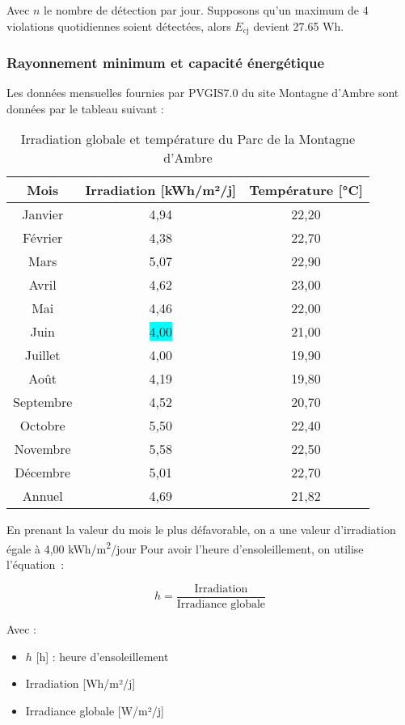 Avec \( n \) le nombre de détection par jour. Supposons qu'un maximum de 4 violations quotidiennes soient détectées, alors \( E_{\text{cj}} \) devient 27.65 Wh.

\subsubsection{	Rayonnement minimum et capacité énergétique}
Les données mensuelles fournies par PVGIS7.0 du site Montagne d'Ambre sont données par le tableau suivant :

\begin{table}[H]
	\centering
	\caption{Irradiation globale et température du Parc de la Montagne d'Ambre
}
	\vspace{5mm}
	\begin{tabular}{|c|c|c|}
		\hline
		\textbf{Mois} & \textbf{Irradiation [kWh/m²/j]} & \textbf{Température [°C]} \\
		\hline
		Janvier & 4,94 & 22,20 \\
		\hline
		Février & 4,38 & 22,70 \\
		\hline
		Mars & 5,07 & 22,90 \\
		\hline
		Avril & 4,62 & 23,00 \\
		\hline
		Mai & 4,46 & 22,00 \\
		\hline
		Juin & \colorbox{cyan}{4,00} & 21,00 \\
		\hline
		Juillet & 4,00 & 19,90 \\
		\hline
		Août & 4,19 & 19,80 \\
		\hline
		Septembre & 4,52 & 20,70 \\
		\hline
		Octobre & 5,50 & 22,40 \\
		\hline
		Novembre & 5,58 & 22,50 \\
		\hline
		Décembre & 5,01 & 22,70 \\
		\hline
		Annuel & 4,69 & 21,82 \\
		\hline
	\end{tabular}
\end{table}

En prenant la valeur du mois le plus défavorable, on a une valeur d’irradiation égale à 4,00 kWh/m\textsuperscript{2}/jour
Pour avoir l’heure d’ensoleillement, on utilise l’équation :

\begin{equation}
h = \frac{\text{Irradiation}}{\text{Irradiance globale}} \tag{2.5}
\end{equation}

Avec :
\begin{itemize}
	\item \( h \) [h] : heure d'ensoleillement
	\item Irradiation [Wh/m²/j]
	\item Irradiance globale [W/m²/j]
\end{itemize}


